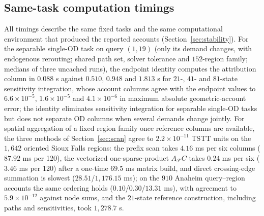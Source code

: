 \subsection{Same-task computation timings}\label{supp:timing}
All timings describe the same fixed tasks and the same computational
environment that produced the reported accounts
(Section~\ref{sec:stability}). For the separable single-OD task on
query $(1,19)$ (only its demand changes, with endogenous rerouting;
shared path set, solver tolerance and $152$-region family; medians of
three uncached runs), the endpoint identity computes the attribution
column in $0.088$ s against $0.510$, $0.948$ and $1.813$ s for $21$-,
$41$- and $81$-state sensitivity integration, whose account columns
agree with the endpoint values to $6.6\times10^{-5}$,
$1.6\times10^{-5}$ and $4.1\times10^{-6}$ in maximum absolute
geometric-account error; the identity eliminates sensitivity
integration for separable single-OD tasks but does not separate OD
columns when several demands change jointly. For spatial aggregation
of a fixed region family once reference columns are available, the
three methods of Section~\ref{sec:scan} agree to
$2.2\times10^{-11}$ TSTT units on the $1{,}642$ oriented Sioux Falls
regions: the prefix scan takes $4.16$ ms per six columns
($87.92$ ms per 120), the vectorized one-sparse-product
$A_{\mathcal F}C$ takes $0.24$ ms per six ($3.46$ ms per 120) after a
one-time $69.5$ ms matrix build, and direct crossing-edge summation is
slowest ($28.51$/$1{,}176.15$ ms); on the $910$ Anaheim query--region
accounts the same ordering holds ($0.10$/$0.30$/$13.31$ ms), with
agreement to $5.9\times10^{-12}$ against node sums, and the $21$-state
reference construction, including paths and sensitivities, took
$1{,}278.7$ s.









